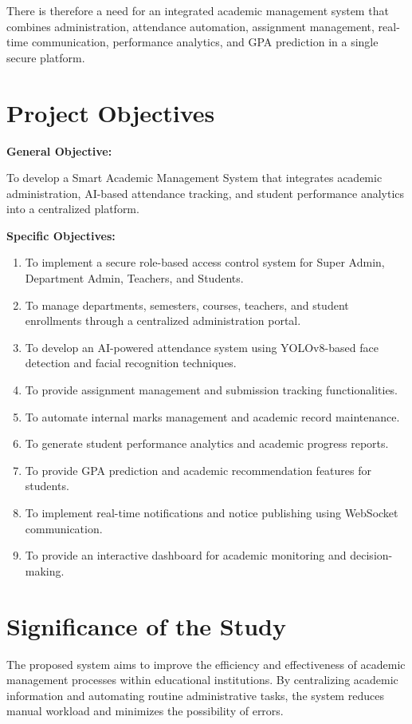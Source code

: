 \documentclass[12pt,a4paper,oneside]{report}
\let\oldsection\section
\renewcommand{\section}{\clearpage\oldsection}
\begin{document}
There is therefore a need for an integrated academic management system that combines administration, attendance automation, assignment management, real-time communication, performance analytics, and GPA prediction in a single secure platform.

\section{Project Objectives}
\textbf{General Objective:}

To develop a Smart Academic Management System that integrates academic administration, AI-based attendance tracking, and student performance analytics into a centralized platform.

\textbf{Specific Objectives:}
\begin{enumerate}
\item To implement a secure role-based access control system for Super Admin, Department Admin, Teachers, and Students.
\item To manage departments, semesters, courses, teachers, and student enrollments through a centralized administration portal.
\item To develop an AI-powered attendance system using YOLOv8-based face detection and facial recognition techniques.
\item To provide assignment management and submission tracking functionalities.
\item To automate internal marks management and academic record maintenance.
\item To generate student performance analytics and academic progress reports.
\item To provide GPA prediction and academic recommendation features for students.
\item To implement real-time notifications and notice publishing using WebSocket communication.
\item To provide an interactive dashboard for academic monitoring and decision-making.
\end{enumerate}

\section{Significance of the Study}
The proposed system aims to improve the efficiency and effectiveness of academic management processes within educational institutions. By centralizing academic information and automating routine administrative tasks, the system reduces manual workload and minimizes the possibility of errors.
\end{document}
